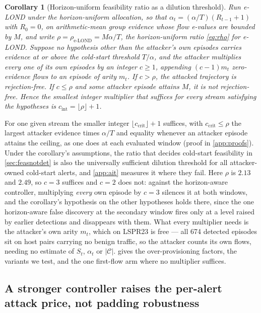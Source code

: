 \documentclass[conference]{IEEEtran}
\newtheorem{corollary}{Corollary}
\newcommand{\Cal}{\mathcal{C}}
\newcommand{\nCal}{\lvert\Cal\rvert}
\newcommand{\ceil}{M}
\newcommand{\alphat}{\alpha_t}
\begin{document}
\begin{corollary}[Horizon-uniform feasibility ratio as a dilution threshold]\label{cor:dilution}
Run e-LOND under the horizon-uniform allocation, so that $\alphat=(\alpha/T)(R_{t-1}+1)$ with
$R_0=0$, on arithmetic-mean group evidence whose flow e-values are bounded by $\ceil$, and write
$\rho=\rho_{\text{e-LOND}}=\ceil\alpha/T$, the horizon-uniform ratio \eqref{eq:rho} for e-LOND. Suppose no hypothesis other than the attacker's own
episodes carries evidence at or above the cold-start threshold $T/\alpha$, and the attacker
multiplies every one of its own episodes by an integer $c\ge1$, appending $(c-1)m_t$ zero-evidence
flows to an episode of arity $m_t$. If $c>\rho$, the attacked trajectory is rejection-free. If
$c\le\rho$ and some attacker episode attains $\ceil$, it is not rejection-free. Hence the smallest integer
multiplier that suffices for every stream satisfying the hypotheses is
$c_{\mathrm{int}}=\lfloor\rho\rfloor+1$.
\end{corollary}

For one given stream the smaller integer $\lfloor c_{\mathrm{crit}}\rfloor+1$ suffices, with
$c_{\mathrm{crit}}\le\rho$ the largest attacker evidence times $\alpha/T$ and equality whenever an attacker
episode attains the ceiling, as one does at each evaluated window (proof in \cref{app:proofs}). Under the corollary's assumptions, the ratio that decides cold-start feasibility in \cref{sec:feasnotdet}
is also the universally sufficient dilution threshold for all attacker-owned cold-start alerts, and
\cref{app:ait} measures it where they fail. Here $\rho$ is $2.13$ and $2.49$, so $c=3$ suffices and $c=2$ does not: against the
horizon-aware controller, multiplying \emph{every} own episode by $c=3$ silences it at both windows,
and the corollary's hypothesis on the other hypotheses holds there, since the one horizon-aware false
discovery at the secondary window fires only at a level raised by earlier detections and disappears
with them. What every multiplier needs is the attacker's own arity $m_t$, which on LSPR23 is free --- all 674 detected episodes sit on host pairs
carrying no benign traffic, so the attacker counts its own flows, needing no estimate of $S_t$, $\alphat$
or $\nCal$.  gives the over-provisioning factors, the variants we test, and the one
first-flow arm where no multiplier suffices.

\subsection{A stronger controller raises the per-alert attack price, not padding robustness}\label{sec:costcurve}
\end{document}
